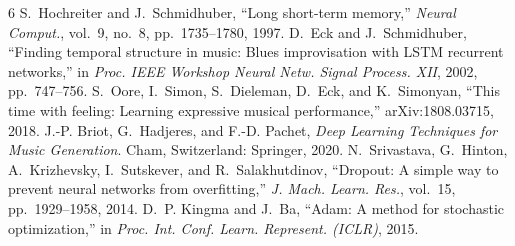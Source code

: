 \documentclass[conference]{IEEEtran}
\begin{document}

\begin{thebibliography}{6}
S.~Hochreiter and J.~Schmidhuber, ``Long short-term memory,'' \emph{Neural Comput.}, vol.~9,
no.~8, pp.~1735--1780, 1997.
D.~Eck and J.~Schmidhuber, ``Finding temporal structure in music: Blues improvisation with
LSTM recurrent networks,'' in \emph{Proc. IEEE Workshop Neural Netw. Signal Process. XII},
2002, pp.~747--756.
S.~Oore, I.~Simon, S.~Dieleman, D.~Eck, and K.~Simonyan, ``This time with feeling: Learning
expressive musical performance,'' arXiv:1808.03715, 2018.
J.-P. Briot, G.~Hadjeres, and F.-D. Pachet, \emph{Deep Learning Techniques for Music
Generation}. Cham, Switzerland: Springer, 2020.
N.~Srivastava, G.~Hinton, A.~Krizhevsky, I.~Sutskever, and R.~Salakhutdinov, ``Dropout: A
simple way to prevent neural networks from overfitting,'' \emph{J. Mach. Learn. Res.},
vol.~15, pp.~1929--1958, 2014.
D.~P. Kingma and J.~Ba, ``Adam: A method for stochastic optimization,'' in \emph{Proc. Int.
Conf. Learn. Represent. (ICLR)}, 2015.
\end{thebibliography}
\end{document}
